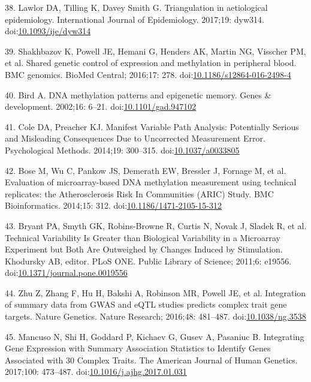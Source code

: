 \documentclass[]{article}
\begin{document}
\hypertarget{ref-Lawlor2017}{}
38. Lawlor DA, Tilling K, Davey Smith G. Triangulation in aetiological
epidemiology. International Journal of Epidemiology. 2017;19: dyw314.
doi:\href{https://doi.org/10.1093/ije/dyw314}{10.1093/ije/dyw314}

\hypertarget{ref-Shakhbazov2016}{}
39. Shakhbazov K, Powell JE, Hemani G, Henders AK, Martin NG, Visscher
PM, et al. Shared genetic control of expression and methylation in
peripheral blood. BMC genomics. BioMed Central; 2016;17: 278.
doi:\href{https://doi.org/10.1186/s12864-016-2498-4}{10.1186/s12864-016-2498-4}

\hypertarget{ref-Bird2002}{}
40. Bird A. DNA methylation patterns and epigenetic memory. Genes \&
development. 2002;16: 6--21.
doi:\href{https://doi.org/10.1101/gad.947102}{10.1101/gad.947102}

\hypertarget{ref-Cole2014}{}
41. Cole DA, Preacher KJ. Manifest Variable Path Analysis: Potentially
Serious and Misleading Consequences Due to Uncorrected Measurement
Error. Psychological Methods. 2014;19: 300--315.
doi:\href{https://doi.org/10.1037/a0033805}{10.1037/a0033805}

\hypertarget{ref-Bose2014}{}
42. Bose M, Wu C, Pankow JS, Demerath EW, Bressler J, Fornage M, et al.
Evaluation of microarray-based DNA methylation measurement using
technical replicates: the Atherosclerosis Risk In Communities (ARIC)
Study. BMC Bioinformatics. 2014;15: 312.
doi:\href{https://doi.org/10.1186/1471-2105-15-312}{10.1186/1471-2105-15-312}

\hypertarget{ref-Bryant2011}{}
43. Bryant PA, Smyth GK, Robins-Browne R, Curtis N, Novak J, Sladek R,
et al. Technical Variability Is Greater than Biological Variability in a
Microarray Experiment but Both Are Outweighed by Changes Induced by
Stimulation. Khodursky AB, editor. PLoS ONE. Public Library of Science;
2011;6: e19556.
doi:\href{https://doi.org/10.1371/journal.pone.0019556}{10.1371/journal.pone.0019556}

\hypertarget{ref-Zhu2016}{}
44. Zhu Z, Zhang F, Hu H, Bakshi A, Robinson MR, Powell JE, et al.
Integration of summary data from GWAS and eQTL studies predicts complex
trait gene targets. Nature Genetics. Nature Research; 2016;48: 481--487.
doi:\href{https://doi.org/10.1038/ng.3538}{10.1038/ng.3538}

\hypertarget{ref-Mancuso2017}{}
45. Mancuso N, Shi H, Goddard P, Kichaev G, Gusev A, Pasaniuc B.
Integrating Gene Expression with Summary Association Statistics to
Identify Genes Associated with 30 Complex Traits. The American Journal
of Human Genetics. 2017;100: 473--487.
doi:\href{https://doi.org/10.1016/j.ajhg.2017.01.031}{10.1016/j.ajhg.2017.01.031}
\end{document}
